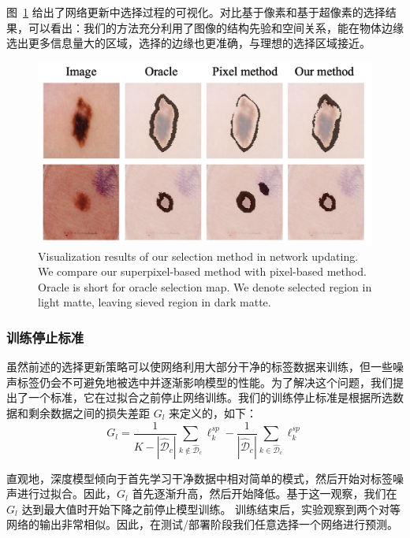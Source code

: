 图~\ref{fig:vis_select} 给出了网络更新中选择过程的可视化。对比基于像素和基于超像素的选择结果，可以看出：我们的方法充分利用了图像的结构先验和空间关系，能在物体边缘选出更多信息量大的区域，选择的边缘也更准确，与理想的选择区域接近。

    \begin{figure}[tbp]
        \centering 
        \includegraphics[width=1.0\textwidth]{img/c4/b_select2.png}
        {Visualization results of our selection method in network updating. We compare our superpixel-based method with pixel-based method. Oracle is short for oracle selection map. We denote selected region in light matte, leaving sieved region in dark matte. }
        \label{fig:vis_select}
    \end{figure}

\subsubsection{训练停止标准}
虽然前述的选择更新策略可以使网络利用大部分干净的标签数据来训练，但一些噪声标签仍会不可避免地被选中并逐渐影响模型的性能。为了解决这个问题，我们提出了一个标准，它在过拟合之前停止网络训练。我们的训练停止标准是根据所选数据和剩余数据之间的损失差距 $G_l$ 来定义的，如下：
\begin{equation}\label{loss_gap}
	G_{l} =    \frac{1}{K-|\mathcal{\hat{D}}_c|}\sum_{k \notin \mathcal{\hat{D}}_c}\ell_k^{sp} - \frac{1}{|\mathcal{\hat{D}}_c|}\sum_{k \in \mathcal{\hat{D}}_c}\ell_k^{sp} 
\end{equation}

直观地，深度模型倾向于首先学习干净数据中相对简单的模式，然后开始对标签噪声进行过拟合\citep{arpit2017closer}。因此，$G_{l}$ 首先逐渐升高，然后开始降低。基于这一观察，我们在 $G_{l}$ 达到最大值时开始下降之前停止模型训练。
训练结束后，实验观察到两个对等网络的输出非常相似。因此，在测试/部署阶段我们任意选择一个网络进行预测。

